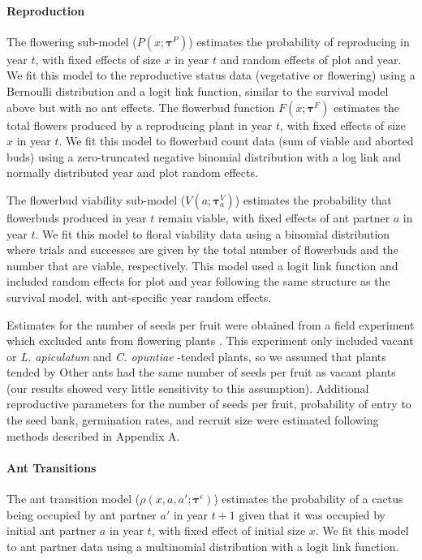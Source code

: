 \documentclass[11pt]{article}
\begin{document}
\paragraph{Reproduction}
The flowering sub-model ($P(x;\pmb{\tau}^{P})$) estimates the probability of reproducing in year $t$, with fixed effects of size $x$ in year $t$ and random effects of plot and year.
We fit this model to the reproductive status data (vegetative or flowering) using a Bernoulli distribution and a logit link function, similar to the survival model above but with no ant effects.  
The flowerbud function $F(x;\pmb{\tau}^{F})$ estimates the total flowers produced by a reproducing plant in year $t$, with fixed effects of size $x$ in year $t$. 
We fit this model to flowerbud count data (sum of viable and aborted buds) using a zero-truncated negative binomial distribution with a log link and normally distributed year and plot random effects.

The flowerbud viability sub-model ($V(a;\pmb{\tau}^{V}_{a})$) estimates the probability that flowerbuds produced in year $t$ remain viable, with fixed effects of ant partner $a$ in year $t$.
We fit this model to floral viability data using a binomial distribution where trials and successes are given by the total number of flowerbuds and the number that are viable, respectively.
This model used a logit link function and included random effects for plot and year following the same structure as the survival model, with ant-specific year random effects. 

Estimates for the number of seeds per fruit were obtained from a field experiment which excluded ants from flowering plants \citep{Ohm2014}.
This experiment only included  vacant or \textit{L. apiculatum} and \textit{C. opuntiae} -tended plants, so we assumed that plants tended by Other ants had the same number of seeds per fruit as vacant plants (our results showed very little sensitivity to this assumption). 
Additional reproductive parameters for the number of seeds per fruit, probability of entry to the seed bank, germination rates, and recruit size were estimated following methods described in Appendix A.

\paragraph{Ant Transitions}
The ant transition model ($\rho(x,a,a';\pmb{\tau}^{\epsilon})$) estimates the probability of a cactus being occupied by ant partner $a'$ in year $t+1$ given that it was occupied by initial ant partner $a$  in year $t$, with fixed effect of initial size $x$.
We fit this model to ant partner data using a multinomial distribution with a logit link function. 
\end{document}
